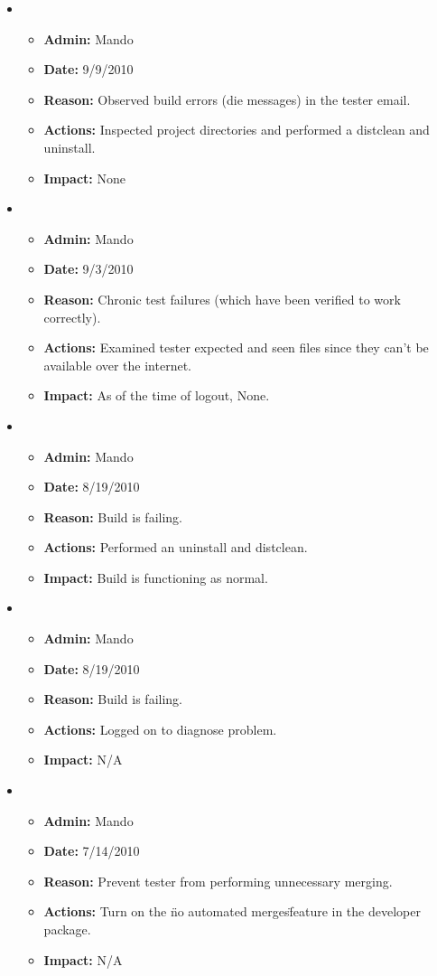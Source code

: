 \documentclass[12pt]{article}
\begin{document}
\begin{itemize}
\item 
\begin{itemize}
\item[] {\bf Admin:} Mando
\item[] {\bf Date:} 9/9/2010
\item[] {\bf Reason:} Observed build errors (die messages) in the tester email. 
\item[] {\bf Actions:} Inspected project directories and performed a distclean and uninstall.
\item[] {\bf Impact:} None
\end{itemize}

\item 
\begin{itemize}
\item[] {\bf Admin:} Mando
\item[] {\bf Date:} 9/3/2010
\item[] {\bf Reason:} Chronic test failures (which have been verified to work correctly). 
\item[] {\bf Actions:} Examined tester expected and seen files since they can't be available over the internet.
\item[] {\bf Impact:} As of the time of logout, None.
\end{itemize}
	
\item 
\begin{itemize}
\item[] {\bf Admin:} Mando
\item[] {\bf Date:} 8/19/2010
\item[] {\bf Reason:} Build is failing. 
\item[] {\bf Actions:} Performed an uninstall and distclean.
\item[] {\bf Impact:} Build is functioning as normal.
\end{itemize}
	
\item 
\begin{itemize}
\item[] {\bf Admin:} Mando
\item[] {\bf Date:} 8/19/2010
\item[] {\bf Reason:} Build is failing. 
\item[] {\bf Actions:} Logged on to diagnose problem.
\item[] {\bf Impact:} N/A
\end{itemize}
	
\item 
\begin{itemize}
\item[] {\bf Admin:} Mando
\item[] {\bf Date:} 7/14/2010
\item[] {\bf Reason:} Prevent tester from performing unnecessary merging. 
\item[] {\bf Actions:} Turn on the \"no automated merges\" feature in the developer package.
\item[] {\bf Impact:} N/A
\end{itemize}


\end{itemize}
\end{document}
